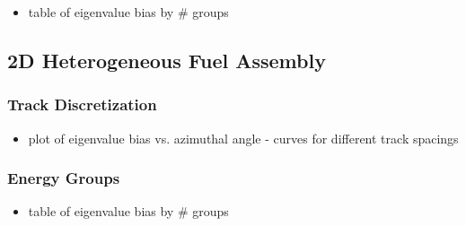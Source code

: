 \begin{itemize}
  \item table of eigenvalue bias by \# groups
\end{itemize}

\subsection{2D Heterogeneous Fuel Assembly}

\subsubsection{Track Discretization}
\label{subsubsec:chap4-hetero-lattice-tracks}

\begin{itemize}
  \item plot of eigenvalue bias vs. azimuthal angle - curves for different track spacings
\end{itemize}

\subsubsection{Energy Groups}
\label{subsubsec:chap4-hetero-lattice-energy}

\begin{itemize}
  \item table of eigenvalue bias by \# groups
\end{itemize}
